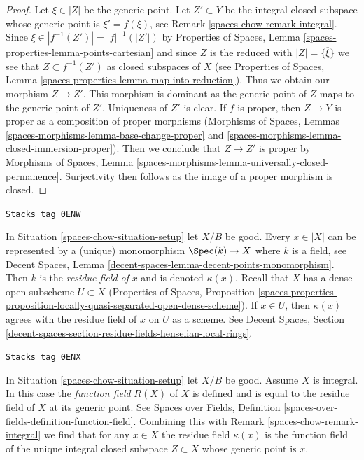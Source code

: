 \begin{proof}
Let $\xi \in |Z|$ be the generic point. Let $Z' \subset Y$ be the integral
closed subspace whose generic point is $\xi' = f(\xi)$, see
Remark \ref{spaces-chow-remark-integral}. Since $\xi \in |f^{-1}(Z')| = |f|^{-1}(|Z'|)$
by Properties of Spaces, Lemma \ref{spaces-properties-lemma-points-cartesian}
and since $Z$ is the reduced with $|Z| = \overline{\{\xi\}}$
we see that $Z \subset f^{-1}(Z')$ as closed subspaces of $X$ (see
Properties of Spaces, Lemma \ref{spaces-properties-lemma-map-into-reduction}).
Thus we obtain our morphism $Z \to Z'$.
This morphism is dominant as the generic point of $Z$
maps to the generic point of $Z'$. Uniqueness of $Z'$ is clear.
If $f$ is proper, then $Z \to Y$ is proper as a composition
of proper morphisms (Morphisms of Spaces, Lemmas
\ref{spaces-morphisms-lemma-base-change-proper} and
\ref{spaces-morphisms-lemma-closed-immersion-proper}).
Then we conclude that $Z \to Z'$ is proper by
Morphisms of Spaces, Lemma
\ref{spaces-morphisms-lemma-universally-closed-permanence}.
Surjectivity then follows as the image of a proper morphism is closed.
\end{proof}

\begin{remark}
\label{spaces-chow-remark-residue-field}
\href{https://stacks.math.columbia.edu/tag/0ENW}{\texttt{Stacks tag 0ENW}}

In Situation \ref{spaces-chow-situation-setup} let $X/B$ be good. Every $x \in |X|$
can be represented by a (unique) monomorphism $\Spec(k) \to X$ where
$k$ is a field, see
Decent Spaces, Lemma \ref{decent-spaces-lemma-decent-points-monomorphism}.
Then $k$ is the {\it residue field of} $x$ and is denoted $\kappa(x)$.
Recall that $X$ has a dense open subscheme $U \subset X$
(Properties of Spaces, Proposition
\ref{spaces-properties-proposition-locally-quasi-separated-open-dense-scheme}).
If $x \in U$, then $\kappa(x)$ agrees with the residue
field of $x$ on $U$ as a scheme. See Decent Spaces, Section
\ref{decent-spaces-section-residue-fields-henselian-local-rings}.
\end{remark}

\begin{remark}
\label{spaces-chow-remark-function-field}
\href{https://stacks.math.columbia.edu/tag/0ENX}{\texttt{Stacks tag 0ENX}}

In Situation \ref{spaces-chow-situation-setup} let $X/B$ be good. Assume $X$ is integral.
In this case the {\it function field} $R(X)$ of $X$ is defined and
is equal to the residue field of $X$ at its generic point.
See Spaces over Fields, Definition
\ref{spaces-over-fields-definition-function-field}.
Combining this with Remark \ref{spaces-chow-remark-integral}
we find that for any $x \in X$ the residue field
$\kappa(x)$ is the function field of the
unique integral closed subspace $Z \subset X$
whose generic point is $x$.
\end{remark}

